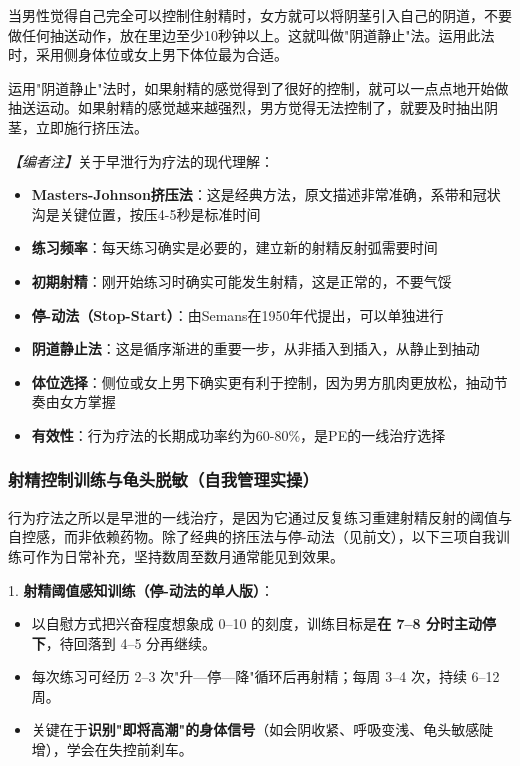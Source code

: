 当男性觉得自己完全可以控制住射精时，女方就可以将阴茎引入自己的阴道，不要做任何抽送动作，放在里边至少10秒钟以上。这就叫做"阴道静止"法。运用此法时，采用侧身体位或女上男下体位最为合适。

运用"阴道静止"法时，如果射精的感觉得到了很好的控制，就可以一点点地开始做抽送运动。如果射精的感觉越来越强烈，男方觉得无法控制了，就要及时抽出阴茎，立即施行挤压法。

\noindent\textit{【编者注】}关于早泄行为疗法的现代理解：
\begin{itemize}
	\item \textbf{Masters-Johnson挤压法}：这是经典方法，原文描述非常准确，系带和冠状沟是关键位置，按压4-5秒是标准时间
	\item \textbf{练习频率}：每天练习确实是必要的，建立新的射精反射弧需要时间
	\item \textbf{初期射精}：刚开始练习时确实可能发生射精，这是正常的，不要气馁
	\item \textbf{停-动法（Stop-Start）}：由Semans在1950年代提出，可以单独进行
	\item \textbf{阴道静止法}：这是循序渐进的重要一步，从非插入到插入，从静止到抽动
	\item \textbf{体位选择}：侧位或女上男下确实更有利于控制，因为男方肌肉更放松，抽动节奏由女方掌握
	\item \textbf{有效性}：行为疗法的长期成功率约为60-80\%，是PE的一线治疗选择
\end{itemize}

\subsubsection{射精控制训练与龟头脱敏（自我管理实操）}

行为疗法之所以是早泄的一线治疗，是因为它通过反复练习重建射精反射的阈值与自控感，而非依赖药物。除了经典的挤压法与停-动法（见前文），以下三项自我训练可作为日常补充，坚持数周至数月通常能见到效果。

1. \textbf{射精阈值感知训练（停-动法的单人版）}：
  \begin{itemize}
  \item 以自慰方式把兴奋程度想象成 0--10 的刻度，训练目标是\textbf{在 7--8 分时主动停下}，待回落到 4--5 分再继续。
  \item 每次练习可经历 2--3 次"升—停—降"循环后再射精；每周 3--4 次，持续 6--12 周。
  \item 关键在于\textbf{识别"即将高潮"的身体信号}（如会阴收紧、呼吸变浅、龟头敏感陡增），学会在失控前刹车。
  \end{itemize}

